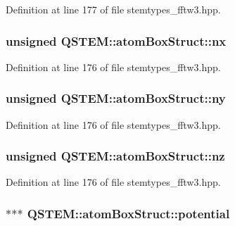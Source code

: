 Definition at line 177 of file stemtypes\-\_\-fftw3.\-hpp.

\hypertarget{struct_q_s_t_e_m_1_1atom_box_struct_afd8dc9d068225a984970806988bf6995}{
\subsubsection[{nx}]{\setlength{\rightskip}{0pt plus 5cm}unsigned Q\-S\-T\-E\-M\-::atom\-Box\-Struct\-::nx}}\label{struct_q_s_t_e_m_1_1atom_box_struct_afd8dc9d068225a984970806988bf6995}


Definition at line 176 of file stemtypes\-\_\-fftw3.\-hpp.

\hypertarget{struct_q_s_t_e_m_1_1atom_box_struct_a36232f5fc60ab2ef6ec7af084d805b89}{
\subsubsection[{ny}]{\setlength{\rightskip}{0pt plus 5cm}unsigned Q\-S\-T\-E\-M\-::atom\-Box\-Struct\-::ny}}\label{struct_q_s_t_e_m_1_1atom_box_struct_a36232f5fc60ab2ef6ec7af084d805b89}


Definition at line 176 of file stemtypes\-\_\-fftw3.\-hpp.

\hypertarget{struct_q_s_t_e_m_1_1atom_box_struct_a26dc3381f5a257af76831a8db911be40}{
\subsubsection[{nz}]{\setlength{\rightskip}{0pt plus 5cm}unsigned Q\-S\-T\-E\-M\-::atom\-Box\-Struct\-::nz}}\label{struct_q_s_t_e_m_1_1atom_box_struct_a26dc3381f5a257af76831a8db911be40}


Definition at line 176 of file stemtypes\-\_\-fftw3.\-hpp.

\hypertarget{struct_q_s_t_e_m_1_1atom_box_struct_a9757097504066a098b30326d79cdfa7e}{
\subsubsection[{potential}]{$\ast$$\ast$$\ast$ Q\-S\-T\-E\-M\-::atom\-Box\-Struct\-::potential}}\label{struct_q_s_t_e_m_1_1atom_box_struct_a9757097504066a098b30326d79cdfa7e}


